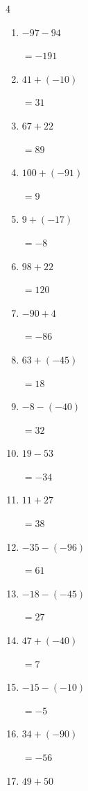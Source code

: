 \begin{multicols}{4}
\begin{enumerate}
        $=59$

  \item $-97-94$

        $=-191$

  \item $41+(-10)$

        $=31$

  \item $67+22$

        $=89$

  \item $100+(-91)$

        $=9$

  \item $9+(-17)$

        $=-8$

  \item $98+22$

        $=120$

  \item $-90+4$

        $=-86$

  \item $63+(-45)$

        $=18$

  \item $-8-(-40)$

        $=32$

  \item $19-53$

        $=-34$

  \item $11+27$

        $=38$

  \item $-35-(-96)$

        $=61$

  \item $-18-(-45)$

        $=27$

\columnbreak %

  \item $47+(-40)$

        $=7$

  \item $-15-(-10)$

        $=-5$

  \item $34+(-90)$

        $=-56$

  \item $49+50$


\end{enumerate}
\end{multicols}
